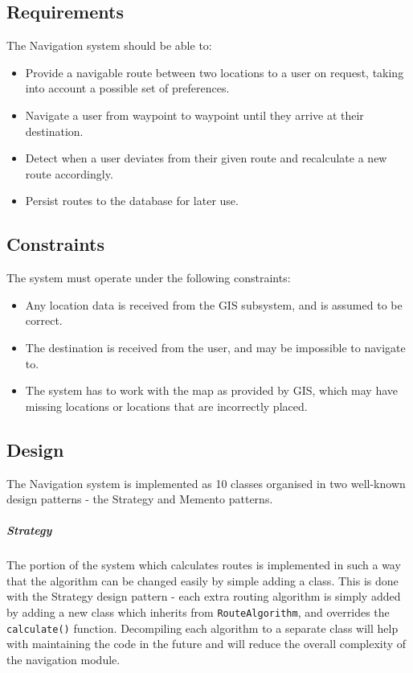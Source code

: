 \documentclass[english]{article}
\begin{document}
       \subsection{Requirements}
            The Navigation system should be able to:
            \begin{itemize}
                \item Provide a navigable route between two locations to a user on request, taking into account a possible set of preferences.
                \item Navigate a user from waypoint to waypoint until they arrive at their destination.
                \item Detect when a user deviates from their given route and recalculate a new route accordingly.
                \item Persist routes to the database for later use.
            \end{itemize}
            
        \subsection{Constraints}
            The system must operate under the following constraints:
            \begin{itemize}
                \item Any location data is received from the GIS subsystem, and is assumed to be correct.
                \item The destination is received from the user, and may be impossible to navigate to.
                \item The system has to work with the map as provided by GIS, which may have missing locations or locations that are incorrectly placed.
            \end{itemize}
            
        \subsection{Design}
            The Navigation system is implemented as 10 classes organised in two well-known design patterns - the Strategy and Memento patterns.
            
            \subparagraph{Strategy}
            The portion of the system which calculates routes is implemented in such a way that the algorithm can be changed easily by simple adding a class. This is done with the Strategy design pattern - each extra routing algorithm is simply added by adding a new class which inherits from \texttt{RouteAlgorithm}, and overrides the \texttt{calculate()} function. Decompiling each algorithm to a separate class will help with maintaining the code in the future and will reduce the overall complexity of the navigation module.
            
\end{document}
